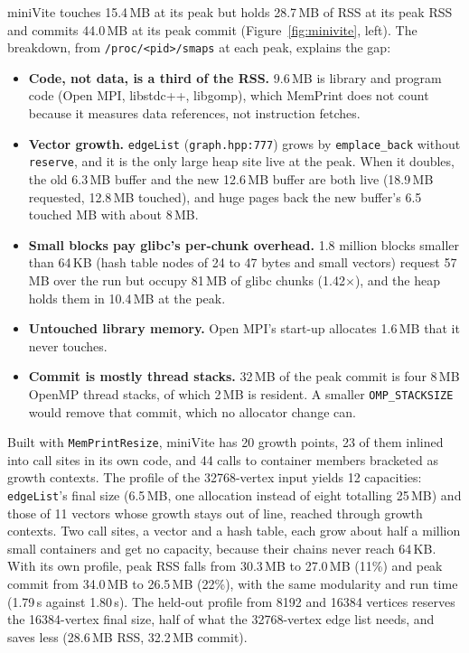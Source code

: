\documentclass[11pt]{article}
\newcommand{\memprint}{MemPrint}
\newcommand{\pass}{\texttt{MemPrintResize}}
\newcommand{\figref}[1]{Figure~\ref{#1}}
\begin{document}
miniVite touches 15.4\,MB at its peak but holds 28.7\,MB of RSS at its peak RSS and commits 44.0\,MB at its peak
commit (\figref{fig:minivite}, left). The breakdown, from \texttt{/proc/<pid>/smaps} at each peak, explains the
gap:
\begin{itemize}
  \item \textbf{Code, not data, is a third of the RSS.} 9.6\,MB is library and program code (Open MPI,
  libstdc++, libgomp), which \memprint{} does not count because it measures data references, not instruction
  fetches.
  \item \textbf{Vector growth.} \texttt{edgeList} (\texttt{graph.hpp:777}) grows by \texttt{emplace\_back}
  without \texttt{reserve}, and it is the only large heap site live at the peak. When it doubles, the old
  6.3\,MB buffer and the new 12.6\,MB buffer are both live (18.9\,MB requested, 12.8\,MB touched), and huge pages
  back the new buffer's 6.5 touched MB with about 8\,MB.
  \item \textbf{Small blocks pay glibc's per-chunk overhead.} 1.8 million blocks smaller than 64\,KB (hash table
  nodes of 24 to 47 bytes and small vectors) request 57\,MB over the run but occupy 81\,MB of glibc chunks
  (1.42$\times$), and the heap holds them in 10.4\,MB at the peak.
  \item \textbf{Untouched library memory.} Open MPI's start-up allocates 1.6\,MB that it never touches.
  \item \textbf{Commit is mostly thread stacks.} 32\,MB of the peak commit is four 8\,MB OpenMP thread stacks, of
  which 2\,MB is resident. A smaller \texttt{OMP\_STACKSIZE} would remove that commit, which no allocator change
  can.
\end{itemize}
Built with \pass{}, miniVite has 20 growth points, 23 of them inlined into call sites in its own code, and 44
calls to container members bracketed as growth contexts. The profile of the 32768-vertex input yields 12
capacities: \texttt{edgeList}'s final size (6.5\,MB, one allocation instead of eight totalling 25\,MB) and those of
11 vectors whose growth stays out of line, reached through growth contexts. Two call sites, a vector and a hash
table, each grow about half a million small containers and get no capacity, because their chains never reach
64\,KB. With its own profile, peak RSS falls from 30.3\,MB to 27.0\,MB (11\%) and
peak commit from 34.0\,MB to 26.5\,MB (22\%), with the same modularity and run time (1.79\,s against 1.80\,s). The
held-out profile from 8192 and 16384 vertices reserves the 16384-vertex final size, half of what the 32768-vertex
edge list needs, and saves less (28.6\,MB RSS, 32.2\,MB commit).
\end{document}
